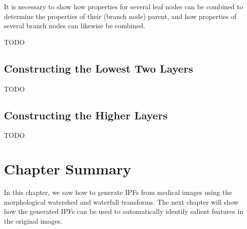 \noindent It is necessary to show how properties for several leaf nodes can be combined to determine the properties of their (branch node) parent, and how properties of several branch nodes can likewise be combined.

TODO

\subsection{Constructing the Lowest Two Layers}

TODO

\subsection{Constructing the Higher Layers}

TODO

\section{Chapter Summary}

In this chapter, we saw how to generate IPFs from medical images using the morphological watershed and waterfall transforms. The next chapter will show how the generated IPFs can be used to automatically identify salient features in the original images.
